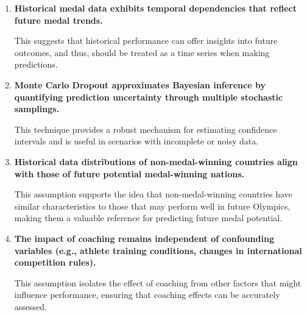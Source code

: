 \documentclass{mcmthesis}
\begin{document}
\begin{enumerate}[leftmargin=0.15in, labelsep=0.1in, itemsep=10pt, parsep=5pt]
	\item \textbf{Historical medal data exhibits temporal dependencies that reflect future medal trends. }
	
	This suggests that historical performance can offer insights into future outcomes, and thus, should be treated as a time series when making predictions.
	
	\item \textbf{Monte Carlo Dropout approximates Bayesian inference by quantifying prediction uncertainty through multiple stochastic samplings.}
	
	This technique provides a robust mechanism for estimating confidence intervals and is useful in scenarios with incomplete or noisy data.
	
	\item \textbf{Historical data distributions of non-medal-winning countries align with those of future potential medal-winning nations.} 
	
	This assumption supports the idea that non-medal-winning countries have similar characteristics to those that may perform well in future Olympics, making them a valuable reference for predicting future medal potential.
	
	\item \textbf{The impact of coaching remains independent of confounding variables (e.g., athlete training conditions, changes in international competition rules).} 
	
	This assumption isolates the effect of coaching from other factors that might influence performance, ensuring that coaching effects can be accurately assessed.
\end{enumerate}

\end{document}
